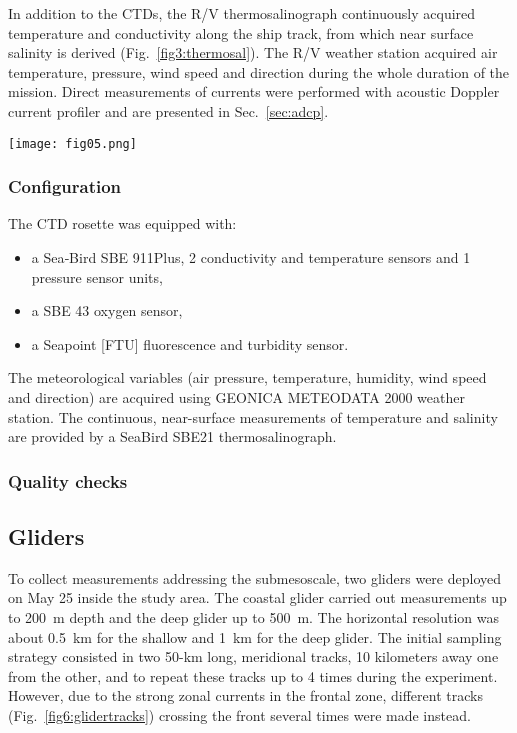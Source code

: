 \documentclass[essd,manuscript]{copernicus}
\begin{document}
In addition to the CTDs, the R/V thermosalinograph continuously acquired temperature and conductivity along the ship track, from which near surface salinity is derived (Fig.~\ref{fig3:thermosal}). The R/V weather station acquired air temperature, pressure, wind speed and direction during the whole duration of the mission. Direct measurements of currents were performed with acoustic Doppler current profiler and are presented in Sec.~\ref{sec:adcp}. 

\begin{figure*}[t]
\texttt{[image: fig05.png]}
\caption{The near-surface salinity (colored dots) measured by the thermosalinograph evidences the strong horizontal gradients, in agreement with the front position as obtained using the SST (broad, dashed line). The 5 subplots depict the temperature and salinity along select meridional tracks. \label{fig3:thermosal}}
\end{figure*}

\subsubsection{Configuration}

The CTD rosette was equipped with:
\begin{itemize}
\item a Sea­‐Bird SBE 911Plus, 2 conductivity and temperature sensors and 1 pressure sensor units,
\item a SBE 43 oxygen sensor,
\item a Seapoint [FTU] fluorescence and turbidity sensor.
\end{itemize}
The meteorological variables (air pressure, temperature, humidity, wind speed and direction) are acquired using GEONICA METEODATA 2000 weather station.
The continuous, near-surface measurements of temperature and salinity are provided by a SeaBird SBE21 thermosalinograph.

\subsubsection{Quality checks}




\subsection{Gliders}

To collect measurements addressing the submesoscale, two gliders were deployed on May 25 inside the study area. The coastal glider carried out measurements up to 200~m depth and the deep glider up to 500~m. The horizontal resolution was about 0.5~km for the shallow and 1~km for the deep glider. The initial sampling strategy consisted in two 50-km long, meridional tracks, 10 kilometers away one from the other, and to repeat these tracks up to 4 times during the experiment. However, due to the strong zonal currents in the frontal zone, different tracks (Fig.~\ref{fig6:glidertracks}) crossing the front several times were made instead.
\end{document}
